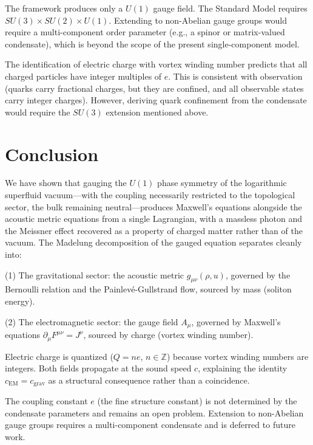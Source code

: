 \documentclass[12pt, a4paper]{article}
\begin{document}
The framework produces only a $U(1)$ gauge field. The Standard Model requires $SU(3) \times SU(2) \times U(1)$. Extending to non-Abelian gauge groups would require a multi-component order parameter (e.g., a spinor or matrix-valued condensate), which is beyond the scope of the present single-component model.

The identification of electric charge with vortex winding number predicts that all charged particles have integer multiples of $e$. This is consistent with observation (quarks carry fractional charges, but they are confined, and all observable states carry integer charges). However, deriving quark confinement from the condensate would require the $SU(3)$ extension mentioned above.

\section{Conclusion}
\label{sec:conclusion}

We have shown that gauging the $U(1)$ phase symmetry of the logarithmic superfluid vacuum---with the coupling necessarily restricted to the topological sector, the bulk remaining neutral---produces Maxwell's equations alongside the acoustic metric equations from a single Lagrangian, with a massless photon and the Meissner effect recovered as a property of charged matter rather than of the vacuum. The Madelung decomposition of the gauged equation separates cleanly into:

(1) The gravitational sector: the acoustic metric $g_{\mu\nu}(\rho, u)$, governed by the Bernoulli relation and the Painlev\'{e}-Gullstrand flow, sourced by mass (soliton energy).

(2) The electromagnetic sector: the gauge field $A_\mu$, governed by Maxwell's equations $\partial_\mu F^{\mu\nu} = J^\nu$, sourced by charge (vortex winding number).

Electric charge is quantized ($Q = ne$, $n \in \mathbb{Z}$) because vortex winding numbers are integers. Both fields propagate at the sound speed $c$, explaining the identity $c_{\mathrm{EM}} = c_{\mathrm{grav}}$ as a structural consequence rather than a coincidence.

The coupling constant $e$ (the fine structure constant) is not determined by the condensate parameters and remains an open problem. Extension to non-Abelian gauge groups requires a multi-component condensate and is deferred to future work.
\end{document}
